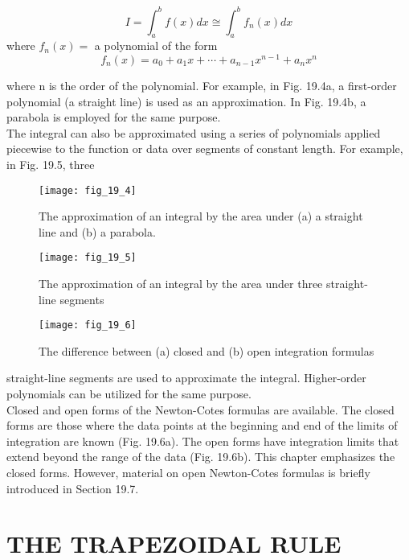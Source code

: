\documentclass[../main.tex]{subfiles}
\begin{document}
		\begin{equation}
			\tag{19.8}
		I=\int_{a}^{b} f(x) d x \cong \int_{a}^{b} f_{n}(x) d x
	\end{equation}
		where $f_{n}(x)=$ a polynomial of the form
		\begin{equation}
			\tag{19.9}
		f_{n}(x)=a_{0}+a_{1} x+\cdots+a_{n-1} x^{n-1}+a_{n} x^{n}
	\end{equation}

	where n is the order of the polynomial. For example, in Fig. 19.4a, a first-order polynomial
	(a straight line) is used as an approximation. In Fig. 19.4b, a parabola is employed for the
	same purpose.\\
	The integral can also be approximated using a series of polynomials applied piecewise
	to the function or data over segments of constant length. For example, in Fig. 19.5, three

	\begin{figure}[H]
		\centering
		\texttt{[image: fig\_19\_4]}
	   \caption{\textsf{The approximation of an integral by the area under (a) a straight line and (b) a parabola.}}\label{fig:fig_19_4}
	\end{figure}
	\begin{figure}[H]
		\centering
		\texttt{[image: fig\_19\_5]}
	   \caption{\textsf{The approximation of an integral by the area under three straight-line segments}}\label{fig:fig_19_5}
	\end{figure}
	\begin{figure}[H]
		\centering
		\texttt{[image: fig\_19\_6]}
	   \caption{\textsf{The difference between (a) closed and (b) open integration formulas}}\label{fig:fig_19_6}
	\end{figure}

	straight-line segments are used to approximate the integral. Higher-order polynomials can
	be utilized for the same purpose.\\
	Closed and open forms of the Newton-Cotes formulas are available. The closed forms
are those where the data points at the beginning and end of the limits of integration are
known (Fig. 19.6a). The open forms have integration limits that extend beyond the range
of the data (Fig. 19.6b). This chapter emphasizes the closed forms. However, material on
open Newton-Cotes formulas is briefly introduced in Section 19.7.
\vspace{1cm}
\section{THE TRAPEZOIDAL RULE}
\end{document}
